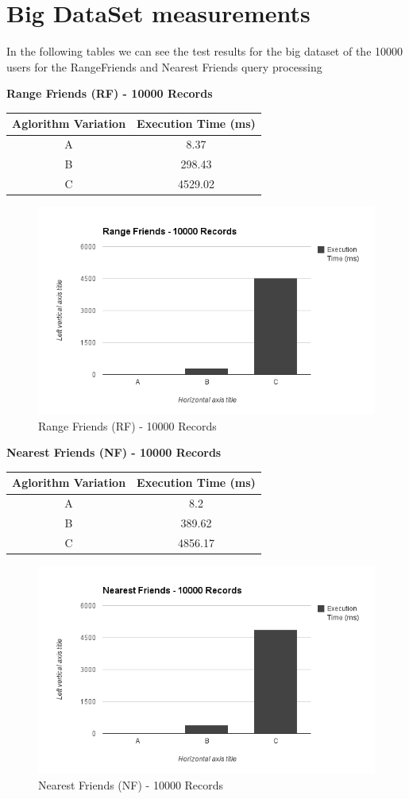 \documentclass[prodmode,acmtods]{acmsmall} %
\begin{document}
\section{Big DataSet measurements}
In the following tables we can see the test results for the big dataset of the 10000 users
for the RangeFriends and Nearest Friends query processing
\newline

\textbf{Range Friends (RF) - 10000 Records}
\begin{tabular}{|c|c|}
\hline \rule[-2ex]{0pt}{5.5ex} Aglorithm Variation & Execution Time (ms) \\ 
\hline \rule[-2ex]{0pt}{5.5ex} A & 8.37 \\ 
\hline \rule[-2ex]{0pt}{5.5ex} B & 298.43 \\ 
\hline \rule[-2ex]{0pt}{5.5ex} C & 4529.02 \\ 
\hline 
\end{tabular} 

\begin{figure}[h]
\centering
\includegraphics[width=0.7\linewidth]{./graphics/rf_10000}
\caption{Range Friends (RF) - 10000 Records}
\label{fig:nf_100}
\end{figure}


\textbf{Nearest Friends (NF) - 10000 Records}
\begin{tabular}{|c|c|}
\hline \rule[-2ex]{0pt}{5.5ex} Aglorithm Variation & Execution Time (ms) \\ 
\hline \rule[-2ex]{0pt}{5.5ex} A & 8.2 \\ 
\hline \rule[-2ex]{0pt}{5.5ex} B & 389.62 \\ 
\hline \rule[-2ex]{0pt}{5.5ex} C & 4856.17 \\ 
\hline 
\end{tabular} 

\begin{figure}[h]
\centering
\includegraphics[width=0.7\linewidth]{./graphics/nf_10000}
\caption{Nearest Friends (NF) - 10000 Records}
\label{fig:nf_100}
\end{figure}
\end{document}
